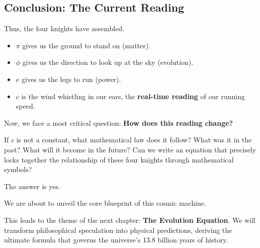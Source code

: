 \subsection{Conclusion: The Current Reading}

Thus, the four knights have assembled.

\begin{itemize}
\item \textbf{$\pi$} gives us the ground to stand on (matter).

\item \textbf{$\phi$} gives us the direction to look up at the sky (evolution).

\item \textbf{$e$} gives us the legs to run (power).

\item \textbf{$c$} is the wind whistling in our ears, the \textbf{real-time reading} of our running speed.
\end{itemize}

Now, we face a most critical question: \textbf{How does this reading change?}

If $c$ is not a constant, what mathematical law does it follow? What was it in the past? What will it become in the future? Can we write an equation that precisely locks together the relationship of these four knights through mathematical symbols?

The answer is yes.

We are about to unveil the core blueprint of this cosmic machine.

This leads to the theme of the next chapter: \textbf{The Evolution Equation}. We will transform philosophical speculation into physical predictions, deriving the ultimate formula that governs the universe's 13.8 billion years of history.


